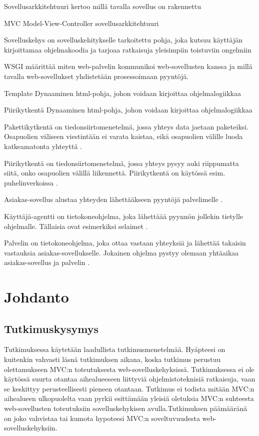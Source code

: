\documentclass[utf8]{gradu3}
\begin{document}
\begin{thetermlist}
\item[Sovellusarkkitehtuuri] kertoo millä tavalla sovellus on rakennettu
\item[MVC] Model-View-Controller sovellusarkkitehtuuri
\item[Sovelluskehys] on sovelluskehitykselle tarkoitettu pohja, joka kutsuu käyttäjän kirjoittamaa ohjelmakoodia ja tarjoaa ratkaisuja yleisimpiin toistuviin ongelmiin
\item[WSGI] määrittää miten web-palvelin kommunikoi web-sovellusten kanssa ja millä tavalla web-sovellukset
yhdistetään prosessoimaan pyyntöjä.
\item[Template] Dynaaminen html-pohja, johon voidaan kirjoittaa ohjelmalogiikkaa
\item[Piirikytkentä] Dynaaminen html-pohja, johon voidaan kirjoittaa ohjelmalogiikkaa
\item[Pakettikytkentä] on tiedonsiirtomenetelmä, jossa yhteys data jaetaan paketeiksi. Osapuolien väliseen viestintään ei varata kaistaa, eikä osapuolien välille luoda katkeamatonta yhteyttä \parencite{kytkenta}.
\item[Piirikytkentä] on tiedonsiirtomenetelmä, jossa yhteys pysyy auki riippumatta siitä, onko osapuolien välillä liikennettä. Piirikytkentä on käytössä esim. puhelinverkoissa \parencite{kytkenta}.
\item[Asiakas-sovellus] alustaa yhteyden lähettääkseen pyyntöjä palvelimelle \cite{http}.
\item[Käyttäjä-agentti] on tietokoneohjelma, joka lähettäää pyynnön jollekin tietylle ohjelmalle. Tällaisia ovat esimerkiksi selaimet \cite{http}. 
\item[Palvelin] on tietokoneohjelma, joka ottaa vastaan yhteyksiä ja lähettää takaisin vastauksia asiakas-sovellukselle. Jokainen ohjelma pystyy olemaan yhtäaikaa asiakas-sovellus ja palvelin \cite{http}. 
\end{thetermlist}

\mainmatter

\chapter{Johdanto}
\section{Tutkimuskysymys}
Tutkimuksessa käytetään laadullista tutkimusmenetelmää. Hyåpteesi on kuitenkin vahvasti läsnä tutkimuksen aikana, koska tutkimus perustuu olettamukseen MVC:n toteutuksesta web-sovelluskehyksissä. Tutkimuksessa ei ole
käytössä suurta otantaa aihealueeseen liittyviä ohjelmistoteknisiä ratkaisuja, vaan se keskittyy perusteellisesti pieneen otantaan. Tutkimus ei todista mitään MVC:n aihealueen ulkopuolelta vaan pyrkii esittämään yleisiä oletuksia 
MVC:n suhteesta web-sovellusten toteutuksiin sovelluskehykisen avulla.Tutkimuksen päämääränä on joko vahvistaa tai kumota hypoteesi MVC:n soveltuvuudesta web-sovelluskehyksiin. 
\end{document}
